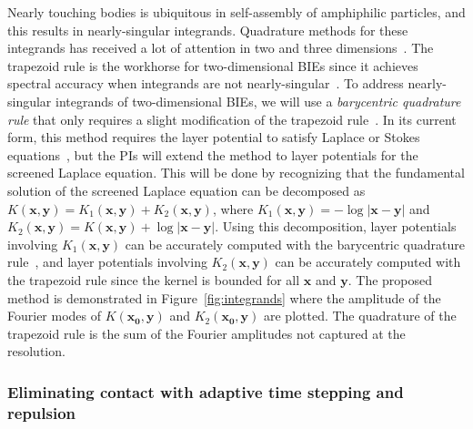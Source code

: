 Nearly touching bodies is ubiquitous in self-assembly of amphiphilic
particles, and this results in nearly-singular integrands. Quadrature
methods for these integrands has received a lot of attention in two and
three dimensions~\cite{alpert, kapur, sidi, duffy, bruno1, bruno2,
davis_1984, graglia_2008, hackbusch_sauter_1994, jarvenpaa_2003,
khayat_2005, schwab_1992, ying_2006, beale1, beale2, goodman_1990,
haroldson_1998, lowengrub_1993, schwab_1992, ggq1, ggq2, ggq3,
helsing_2008a, helsing_integral_2009, helsing_tutorial_2012,
klockner2013jcp, qbx2, wala2019jcp, af2018sisc, siegel2018jcp,
rachh2017jcp, ding2019arxiv, bar2014}. The trapezoid rule is the
workhorse for two-dimensional BIEs since it achieves spectral accuracy
when integrands are not nearly-singular~\cite{tre-wei2014}. To address
nearly-singular integrands of two-dimensional BIEs, we will use a {\em
barycentric quadrature rule} that only requires a slight modification of
the trapezoid rule~\cite{ioa-pap-per1991}. In its current form, this
method requires the layer potential to satisfy Laplace or Stokes
equations~\cite{bar-wu-vee2015, chi-moo-qua2020}, but the PIs will extend
the method to layer potentials for the screened Laplace
equation. This will be done by recognizing that the fundamental solution
of the screened Laplace equation can be decomposed as
$K(\mathbf{x},\mathbf{y}) = K_1(\mathbf{x},\mathbf{y}) +
K_2(\mathbf{x},\mathbf{y})$, where $K_1(\mathbf{x},\mathbf{y}) =
-\log|\mathbf{x} - \mathbf{y}|$ and $K_2(\mathbf{x},\mathbf{y}) =
K(\mathbf{x},\mathbf{y}) + \log|\mathbf{x} - \mathbf{y}|$. Using this
decomposition, layer potentials involving $K_1(\mathbf{x},\mathbf{y})$
can be accurately computed with the barycentric quadrature
rule~\cite{ioa-pap-per1991}, and layer potentials involving
$K_2(\mathbf{x},\mathbf{y})$ can be accurately computed with the
trapezoid rule since the kernel is bounded for all $\mathbf{x}$ and
$\mathbf{y}$. The proposed method is demonstrated in
Figure~\ref{fig:integrands} where the amplitude of the Fourier modes of
$K(\mathbf{x_0},\mathbf{y})$ and $K_2(\mathbf{x_0},\mathbf{y})$ are
plotted. The quadrature of the trapezoid rule is the sum of the Fourier
amplitudes not captured at the resolution.


\subsubsection{Eliminating contact with adaptive time stepping and
repulsion}
\label{subsec:timeStepping}

